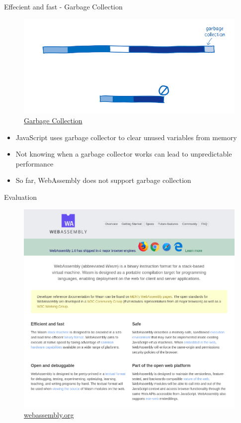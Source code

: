 \documentclass{beamer}
\begin{document}
\begin{frame}{Effecient and fast - Garbage Collection}
    \begin{figure}
        \includegraphics[scale=0.2]{./images/garbage.png}
        \caption{\href{https://www.smashingmagazine.com/2017/05/abridged-cartoon-introduction-webassembly/}{Garbage Collection}}
    \end{figure}
    \begin{itemize}
        \item JavaScript uses garbage collector to clear unused variables from memory
        \item Not knowing when a garbage collector works can lead to unpredictable performance
        \item So far, WebAssembly does not support garbage collection
    \end{itemize}
\end{frame}

\begin{frame}{Evaluation}
    \begin{figure}
        \includegraphics[scale=0.2]{./images/webassembly_org.png}
        \caption{\href{https://webassembly.org/}{webassembly.org}}
    \end{figure}
\end{frame}
\end{document}
